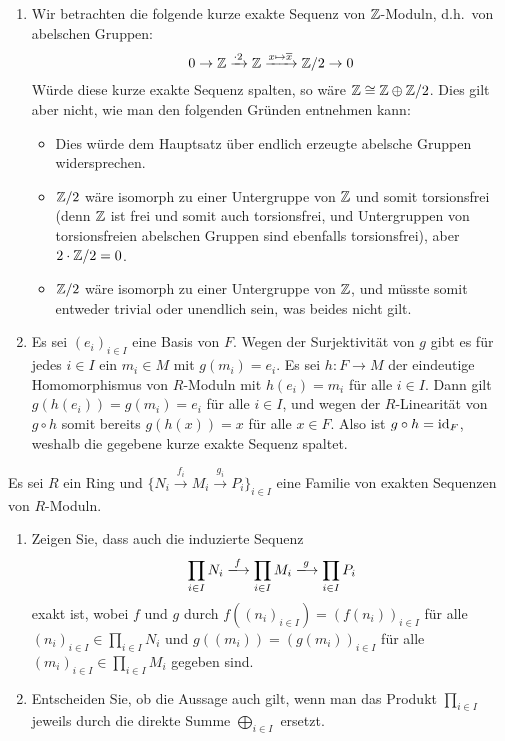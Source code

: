 \begin{solution}
  \begin{enumerate}
    \item
      Wir betrachten die folgende kurze exakte Sequenz von $\mathbb{Z}$-Moduln, d.h.\ von abelschen Gruppen:
      \[
                                              0
        \to                                   \mathbb{Z}
        \xrightarrow{\cdot 2}                 \mathbb{Z}
        \xrightarrow{x \mapsto \overline{x}}  \mathbb{Z}/2
        \to                                   0
      \]
      Würde diese kurze exakte Sequenz spalten, so wäre $\mathbb{Z} \cong \mathbb{Z} \oplus \mathbb{Z}/2$.
      Dies gilt aber nicht, wie man den folgenden Gründen entnehmen kann:
      \begin{itemize}
        \item
          Dies würde dem Hauptsatz über endlich erzeugte abelsche Gruppen widersprechen.
        \item
          $\mathbb{Z}/2$ wäre isomorph zu einer Untergruppe von $\mathbb{Z}$ und somit torsionsfrei (denn $\mathbb{Z}$ ist frei und somit auch torsionsfrei, und Untergruppen von torsionsfreien abelschen Gruppen sind ebenfalls torsionsfrei), aber $2 \cdot \mathbb{Z}/2 = 0$.
        \item
          $\mathbb{Z}/2$ wäre isomorph zu einer Untergruppe von $\mathbb{Z}$, und müsste somit entweder trivial oder unendlich sein, was beides nicht gilt.
      \end{itemize}
    \item
      Es sei $(e_i)_{i \in I}$ eine Basis von $F$.
      Wegen der Surjektivität von $g$ gibt es für jedes $i \in I$ ein $m_i \in M$ mit $g(m_i) = e_i$.
      Es sei $h \colon F \to M$ der eindeutige Homomorphismus von $R$-Moduln mit $h(e_i) = m_i$ für alle $i \in I$.
      Dann gilt $g(h(e_i)) = g(m_i) = e_i$ für alle $i \in I$, und wegen der $R$-Linearität von $g \circ h$ somit bereits $g(h(x)) = x$ für alle $x \in F$.
      Also ist $g \circ h = \operatorname{id}_F$, weshalb die gegebene kurze exakte Sequenz spaltet.
  \end{enumerate}
\end{solution}


\begin{question}
  Es sei $R$ ein Ring und $\{ N_i \xrightarrow{f_i} M_i \xrightarrow{g_i} P_i \}_{i \in I}$ eine Familie von exakten Sequenzen von $R$-Moduln.
  \begin{enumerate}
    \item
      Zeigen Sie, dass auch die induzierte Sequenz
      \[
                            \prod_{i \in I} N_i
        \xlongrightarrow{f} \prod_{i \in I} M_i
        \xlongrightarrow{g} \prod_{i \in I} P_i
      \]
      exakt ist, wobei $f$ und $g$ durch $f((n_i)_{i \in I}) = (f(n_i))_{i \in I}$ für alle $(n_i)_{i \in I} \in \prod_{i \in I} N_i$ und $g((m_i)) = (g(m_i))_{i \in I}$ für alle $(m_i)_{i \in I} \in \prod_{i \in I} M_i$ gegeben sind.
    \item
      Entscheiden Sie, ob die Aussage auch gilt, wenn man das Produkt $\prod_{i \in I}$ jeweils durch die direkte Summe $\bigoplus_{i \in I}$ ersetzt.
  \end{enumerate}
\end{question}


